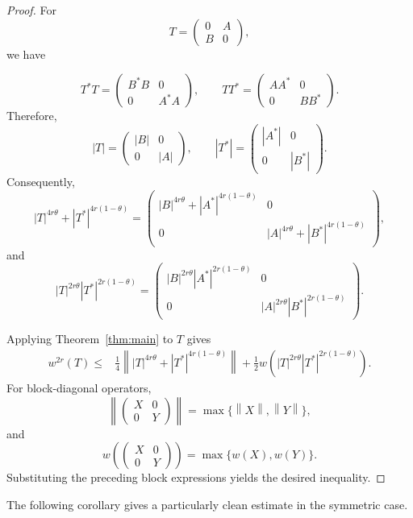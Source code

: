 \documentclass[final,1p,times]{elsarticle}
\newcommand{\norm}[1]{\left\lVert #1 \right\rVert}
\begin{document}
\begin{proof}
For
\[
T=
\begin{pmatrix}
0 & A\\
B & 0
\end{pmatrix},
\]
we have

\[
T^*T=
\begin{pmatrix}
B^*B & 0\\
0 & A^*A
\end{pmatrix},
\qquad
TT^*=
\begin{pmatrix}
AA^* & 0\\
0 & BB^*
\end{pmatrix}.
\]
Therefore,
\[
|T|=
\begin{pmatrix}
|B| & 0\\
0 & |A|
\end{pmatrix},
\qquad
|T^*|=
\begin{pmatrix}
|A^*| & 0\\
0 & |B^*|
\end{pmatrix}.
\]
Consequently,
\[
|T|^{4r\theta}+|T^*|^{4r(1-\theta)}
=
\begin{pmatrix}
|B|^{4r\theta}+|A^*|^{4r(1-\theta)} & 0\\
0 & |A|^{4r\theta}+|B^*|^{4r(1-\theta)}
\end{pmatrix},
\]
and
\[
|T|^{2r\theta}|T^*|^{2r(1-\theta)}
=
\begin{pmatrix}
|B|^{2r\theta}|A^*|^{2r(1-\theta)} & 0\\
0 & |A|^{2r\theta}|B^*|^{2r(1-\theta)}
\end{pmatrix}.
\]

Applying Theorem~\ref{thm:main} to $T$ gives
\[
\begin{aligned}
w^{2r}(T)
\leq {}&
\frac14
\norm{|T|^{4r\theta}+|T^*|^{4r(1-\theta)}}+
\frac12
w\!\left(
|T|^{2r\theta}|T^*|^{2r(1-\theta)}
\right).
\end{aligned}
\]
For block-diagonal operators,
\[
\norm{
\begin{pmatrix}
X&0\\0&Y
\end{pmatrix}}
=
\max\{\norm{X},\norm{Y}\},
\]
and
\[
w\!\left(
\begin{pmatrix}
X&0\\0&Y
\end{pmatrix}
\right)
=
\max\{w(X),w(Y)\}.
\]
Substituting the preceding block expressions yields the desired
inequality.
\end{proof}

\medskip

The following corollary gives a particularly clean estimate in the symmetric
case.
\end{document}
